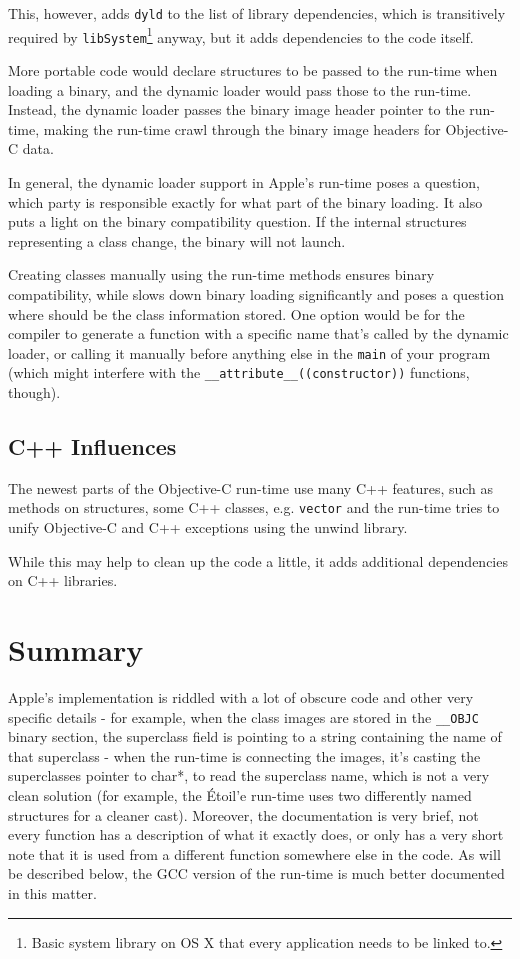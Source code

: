 This, however, adds \verb=dyld= to the list of library dependencies, which is transitively required by \verb=libSystem=\footnote{Basic system library on OS X that every application needs to be linked to.} anyway, but it adds dependencies to the code itself.

More portable code would declare structures to be passed to the run-time when loading a binary, and the dynamic loader would pass those to the run-time. Instead, the dynamic loader passes the binary image header pointer to the run-time, making the run-time crawl through the binary image headers for Objective-C data.

In general, the dynamic loader support in Apple's run-time poses a question, which party is responsible exactly for what part of the binary loading. It also puts a light on the binary compatibility question. If the internal structures representing a class change, the binary will not launch.

Creating classes manually using the run-time methods ensures binary compatibility, while slows down binary loading significantly and poses a question where should be the class information stored. One option would be for the compiler to generate a function with a specific name that's called by the dynamic loader, or calling it manually before anything else in the \verb=main= of your program (which might interfere with the \verb=__attribute__((constructor))= functions, though).

\subsection{C++ Influences}
The newest parts of the Objective-C run-time use many C++ features, such as methods on structures, some C++ classes, e.g. \verb=vector= and the run-time tries to unify Objective-C and C++ exceptions using the unwind library.

While this may help to clean up the code a little, it adds additional dependencies on C++ libraries.

\section{Summary}
Apple's implementation is riddled with a lot of obscure code and other very specific details - for example, when the class images are stored in the \verb=__OBJC= binary section, the superclass field is pointing to a string containing the name of that superclass - when the run-time is connecting the images, it's casting the superclasses pointer to char*, to read the superclass name, which is not a very clean solution (for example, the \'Etoil'e run-time uses two differently named structures for a cleaner cast). Moreover, the documentation is very brief, not every function has a description of what it exactly does, or only has a very short note that it is used from a different function somewhere else in the code. As will be described below, the GCC version of the run-time is much better documented in this matter.
